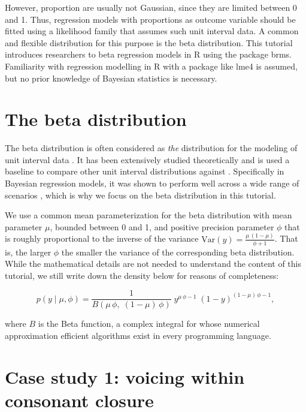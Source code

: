 \documentclass[
  authoryear,
  preprint,
  3p]{elsarticle}
\begin{document}
However, proportion are usually not Gaussian, since they are limited
between 0 and 1. Thus, regression models with proportions as outcome
variable should be fitted using a likelihood family that assumes such
unit interval data. A common and flexible distribution for this purpose
is the beta distribution. This tutorial introduces researchers to beta
regression models in R using the package brms. Familiarity with
regression modelling in R with a package like lme4 is assumed, but no
prior knowledge of Bayesian statistics is necessary.

\section{The beta distribution}\label{the-beta-distribution}

The beta distribution is often considered as \emph{the} distribution for
the modeling of unit interval data
\citep{ferrari_beta_2004, cribari-neto_beta_2010}. It has been
extensively studied theoretically
\citep{krysicki_new_1999, gupta_handbook_2014, espinheira_beta_2008} and
is used a baseline to compare other unit interval distributions against
\citep{kieschnick_regression_2003, bonat_regression_2013, lopez_bayesian_2013}.
Specifically in Bayesian regression models, it was shown to perform well
across a wide range of scenarios
\citep{scholz_posterior_2023, scholz_prediction_2025}, which is why we
focus on the beta distribution in this tutorial.

We use a common mean parameterization for the beta distribution with
mean parameter \(\mu\), bounded between 0 and 1, and positive precision
parameter \(\phi\) that is roughly proportional to the inverse of the
variance \(\text{Var}(y) = \frac{\mu \, (1 - \mu)}{\phi + 1}\). That is,
the larger \(\phi\) the smaller the variance of the corresponding beta
distribution. While the mathematical details are not needed to
understand the content of this tutorial, we still write down the density
below for reasons of completeness:

\[
p(y \mid \mu, \phi) = \frac{1}{B(\mu \, \phi, \; (1-\mu) \, \phi)} \; y^{\mu \, \phi -1} \; (1-y)^{(1-\mu) \, \phi -1},
\]

where \(B\) is the Beta function, a complex integral for whose numerical
approximation efficient algorithms exist in every programming language.

\section{Case study 1: voicing within consonant
closure}\label{case-study-1-voicing-within-consonant-closure}
\end{document}
